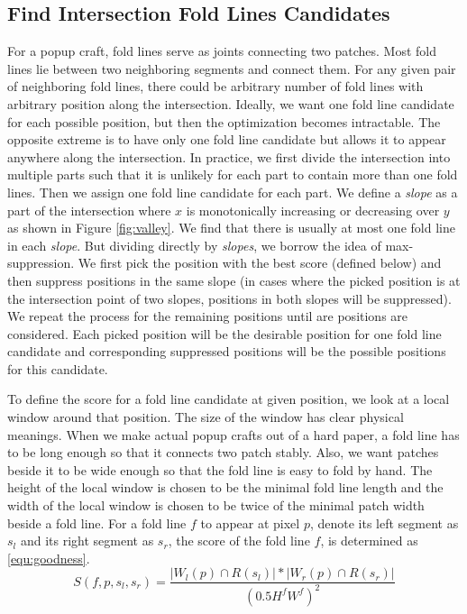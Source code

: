 \subsection{Find Intersection Fold Lines Candidates} \label{intersection_fold_line_candidates}
For a popup craft, fold lines serve as joints connecting two patches. Most fold lines lie between two neighboring segments and connect them. For any given pair of neighboring fold lines, there could be arbitrary number of fold lines with arbitrary position along the intersection. Ideally, we want one fold line candidate for each possible position, but then the optimization becomes intractable. The opposite extreme is to have only one fold line candidate but allows it to appear anywhere along the intersection. In practice, we first divide the intersection into multiple parts such that it is unlikely for each part to contain more than one fold lines. Then we assign one fold line candidate for each part. We define a \textit{slope} as a part of the intersection where $x$ is monotonically increasing or decreasing over $y$ as shown in Figure \ref{fig:valley}. We find that there is usually at most one fold line in each \textit{slope}. But dividing directly by \textit{slopes}, we borrow the idea of max-suppression. We first pick the position with the best score (defined below) and then suppress positions in the same slope (in cases where the picked position is at the intersection point of two slopes, positions in both slopes will be suppressed). We repeat the process for the remaining positions until are positions are considered. Each picked position will be the desirable position for one fold line candidate and corresponding suppressed positions will be the possible positions for this candidate.

To define the score for a fold line candidate at given position, we look at a local window around that position. The size of the window has clear physical meanings. When we make actual popup crafts out of a hard paper, a fold line has to be long enough so that it connects two patch stably. Also, we want patches beside it to be wide enough so that the fold line is easy to fold by hand. The height of the local window is chosen to be the minimal fold line length and the width of the local window is chosen to be twice of the minimal patch width beside a fold line. For a fold line $f$ to appear at pixel $p$, denote its left segment as $s_l$ and its right segment as $s_r$, the score of the fold line $f$, is determined as \ref{equ:goodness}.
\begin{equation}
  S(f, p, s_l, s_r) = \frac{|W_l(p) \cap R(s_l)| * |W_r(p) \cap R(s_r)|}{(0.5 H^f W^f)^2}
  \label{equ:goodness}
\end{equation}


